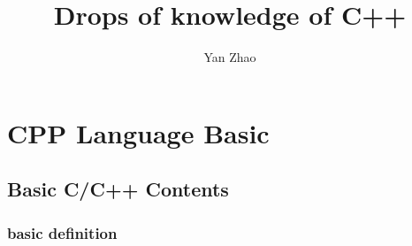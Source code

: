 \documentclass[a4paper,12pt,twoside]{book}
\begin{document}
\title{Drops of knowledge of C++}
\author{Yan Zhao}
\date{}\maketitle

\setcounter{secnumdepth}{4}
\setcounter{tocdepth}{4}
\tableofcontents
\chapter{CPP Language Basic}


\section{Basic C/C++ Contents}
\subsection{basic definition}
\end{document}
